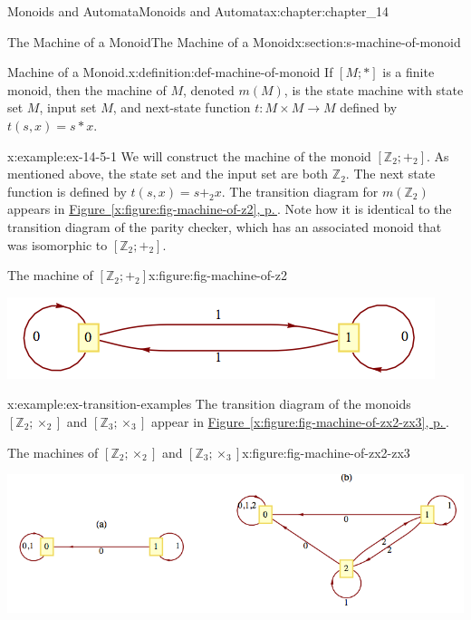 \documentclass[twoside,10pt,]{book}
\newcommand{\xreffont}{\relax}
\numberwithin{equation}{section}
\begin{document}
\begin{chapterptx}{Monoids and Automata}{}{Monoids and Automata}{}{}{x:chapter:chapter_14}
\begin{sectionptx}{The Machine of a Monoid}{}{The Machine of a Monoid}{}{}{x:section:s-machine-of-monoid}
\begin{definition}{Machine of a Monoid.}{x:definition:def-machine-of-monoid}%
%
\label{g:notation:idm404599570048}%
If \([M;*]\) is a finite monoid, then the machine of \(M\), denoted \(m(M)\), is the state machine with state set \(M\), input set \(M\), and next-state function \(t : M\times M \to M\) defined by  \(t(s, x) = s * x\).%
\end{definition}
\begin{example}{}{x:example:ex-14-5-1}%
We will construct the machine of the monoid \(\left[\mathbb{Z}_2;+_2\right]\). As mentioned above, the state set and the input set are both \(\mathbb{Z}_2\). The next state function is defined by \(t(s, x) = s +_2 x\). The transition diagram for \(m\left(\mathbb{Z}_2\right)\) appears in \hyperref[x:figure:fig-machine-of-z2]{Figure~{\xreffont\ref{x:figure:fig-machine-of-z2}}, p.\,\pageref{x:figure:fig-machine-of-z2}}. Note how it is identical to the transition diagram of the parity checker, which has an associated monoid that was isomorphic to \(\left[\mathbb{Z}_2;+_2\right].\)%
\begin{figureptx}{The machine of \([\mathbb{Z}_2;+_2]\)}{x:figure:fig-machine-of-z2}{}%
\begin{image}{0.15}{0.7}{0.15}%
\includegraphics[width=\linewidth]{images/fig-machine-of-z2.png}
\end{image}%
\tcblower
\end{figureptx}%
\end{example}
\begin{example}{}{x:example:ex-transition-examples}%
The transition diagram of the monoids \(\left[\mathbb{Z}_2;\times _2\right]\) and \(\left[\mathbb{Z}_3;\times _3\right]\) appear in \hyperref[x:figure:fig-machine-of-zx2-zx3]{Figure~{\xreffont\ref{x:figure:fig-machine-of-zx2-zx3}}, p.\,\pageref{x:figure:fig-machine-of-zx2-zx3}}.%
\begin{figureptx}{The machines of \([\mathbb{Z}_2;\times_2]\) and \([\mathbb{Z}_3;	\times_3]\)}{x:figure:fig-machine-of-zx2-zx3}{}%
\begin{image}{0.15}{0.7}{0.15}%
\includegraphics[width=\linewidth]{images/fig-machine-of-zx2-zx3.png}

\end{image}
\end{figureptx}
\end{example}
\end{sectionptx}
\end{chapterptx}
\end{document}
